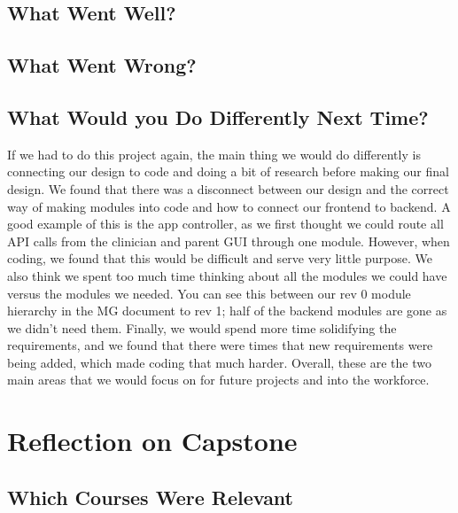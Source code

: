 \documentclass{article}
\begin{document}
\subsection{What Went Well?}




\subsection{What Went Wrong?}


\subsection{What Would you Do Differently Next Time?}

If we had to do this project again, the main thing we would do differently is connecting our design to code and doing a bit of research before making our final design. 
We found that there was a disconnect between our design and the correct way of making modules into code and how to connect our frontend to backend. A good example of this is 
the app controller, as we first thought we could route all API calls from the clinician and parent GUI through one module. However, when coding, we found that this would be 
difficult and serve very little purpose. We also think we spent too much time thinking about all the modules we could have versus the modules we needed. You can see this between our
rev 0 module hierarchy in the MG document to rev 1; half of the backend modules are gone as we didn't need them. Finally, we would spend more time solidifying the requirements, and we found that 
there were times that new requirements were being added, which made coding that much harder. Overall, these are the two main areas that we would focus on for future projects and into the workforce.

\section{Reflection on Capstone}


\subsection{Which Courses Were Relevant}
\end{document}
